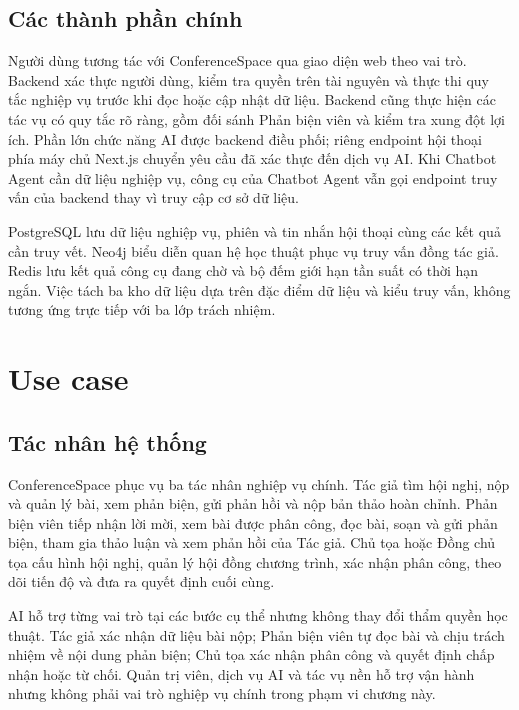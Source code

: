 \subsection{Các thành phần chính}

Người dùng tương tác với ConferenceSpace qua giao diện web theo vai trò. Backend xác thực người dùng, kiểm tra quyền trên tài nguyên và thực thi quy tắc nghiệp vụ trước khi đọc hoặc cập nhật dữ liệu. Backend cũng thực hiện các tác vụ có quy tắc rõ ràng, gồm đối sánh Phản biện viên và kiểm tra xung đột lợi ích. Phần lớn chức năng AI được backend điều phối; riêng endpoint hội thoại phía máy chủ Next.js chuyển yêu cầu đã xác thực đến dịch vụ AI. Khi Chatbot Agent cần dữ liệu nghiệp vụ, công cụ của Chatbot Agent vẫn gọi endpoint truy vấn của backend thay vì truy cập cơ sở dữ liệu.

PostgreSQL lưu dữ liệu nghiệp vụ, phiên và tin nhắn hội thoại cùng các kết quả cần truy vết. Neo4j biểu diễn quan hệ học thuật phục vụ truy vấn đồng tác giả. Redis lưu kết quả công cụ đang chờ và bộ đếm giới hạn tần suất có thời hạn ngắn. Việc tách ba kho dữ liệu dựa trên đặc điểm dữ liệu và kiểu truy vấn, không tương ứng trực tiếp với ba lớp trách nhiệm.

\section{Use case}
\label{sec:ch3-demo-usecases}

\subsection{Tác nhân hệ thống}

ConferenceSpace phục vụ ba tác nhân nghiệp vụ chính. Tác giả tìm hội nghị, nộp và quản lý bài, xem phản biện, gửi phản hồi và nộp bản thảo hoàn chỉnh. Phản biện viên tiếp nhận lời mời, xem bài được phân công, đọc bài, soạn và gửi phản biện, tham gia thảo luận và xem phản hồi của Tác giả. Chủ tọa hoặc Đồng chủ tọa cấu hình hội nghị, quản lý hội đồng chương trình, xác nhận phân công, theo dõi tiến độ và đưa ra quyết định cuối cùng.

AI hỗ trợ từng vai trò tại các bước cụ thể nhưng không thay đổi thẩm quyền học thuật. Tác giả xác nhận dữ liệu bài nộp; Phản biện viên tự đọc bài và chịu trách nhiệm về nội dung phản biện; Chủ tọa xác nhận phân công và quyết định chấp nhận hoặc từ chối. Quản trị viên, dịch vụ AI và tác vụ nền hỗ trợ vận hành nhưng không phải vai trò nghiệp vụ chính trong phạm vi chương này.

